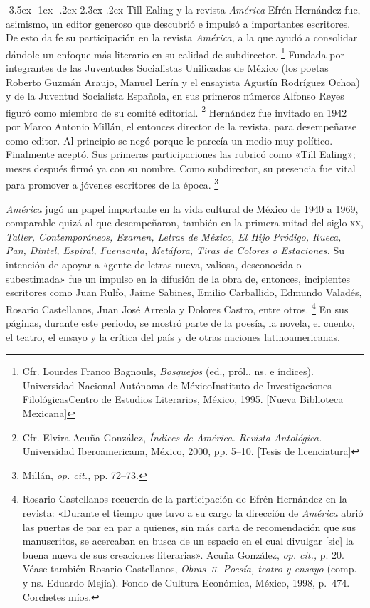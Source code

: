 \documentclass[14pt,twoside,final]{extbook} %
\makeatletter
\let\oldfootnote\footnote
\renewcommand\footnote[1]{%
\oldfootnote{\hspace{1mm}#1}}
\renewcommand\section{\@startsection {section}{1}{\z@}%
                                     {-3.5ex \@plus -1ex \@minus -.2ex}%
                                     {2.3ex \@plus .2ex}%
                                     {\normalfont\large\bfseries\sc}}
\makeatother
\begin{document}
\section{Till Ealing y la revista \emph{América}}\label{sec:till-ealing-y-la-revista-america}
Efrén Hernández fue, asimismo, un editor generoso que descubrió e impulsó a importantes escritores. De esto da fe su participación en la revista \emph{América,} a la que ayudó a consolidar dándole un enfoque más literario en su calidad de subdirector.\footnote{Cfr. Lourdes Franco Bagnouls, \emph{Bosquejos} (ed., pról., ns. e índices). Universidad Nacional Autónoma de México\kernedslash Instituto de Investigaciones Filológicas\kernedslash Centro de Estudios Literarios, México, 1995. [Nueva Biblioteca Mexicana]} Fundada por integrantes de las Juventudes Socialistas Unificadas de México (los poetas Roberto Guzmán Araujo, Manuel Lerín y el ensayista Agustín Rodríguez Ochoa) y de la Juventud Socialista Española, en sus primeros números Alfonso Reyes figuró como miembro de su comité editorial.\footnote{Cfr. Elvira Acuña González, \emph{Índices de \emph{América. Revista Antológica}.} Universidad Iberoamericana, México, 2000, pp. 5--10. [Tesis de licenciatura]} Hernández fue invitado en 1942 por Marco Antonio Millán, el entonces director de la revista, para desempeñarse como editor. Al principio se negó porque le parecía un medio muy político. Finalmente aceptó. Sus primeras participaciones las rubricó como «Till Ealing»; meses después firmó ya con su nombre. Como subdirector, su presencia fue vital para promover a jóvenes escritores de la época.\footnote{Millán, \emph{op. cit.,} pp. 72--73.}

\emph{América} jugó un papel importante en la vida cultural de México de 1940 a 1969, comparable quizá al que desempeñaron, también en la primera mitad del siglo \textsc{xx}, \textit{Taller, Contemporáneos, Examen, Letras de México, El Hijo Pródigo, Rueca, Pan, Dintel, Espiral, Fuensanta, Metáfora, Tiras de Colores \emph{o} Estaciones.} Su intención de apoyar a «gente de letras nueva, valiosa, desconocida o subestimada» fue un impulso en la difusión de la obra de, entonces, incipientes escritores como Juan Rulfo, Jaime Sabines, Emilio Carballido, Edmundo Valadés, Rosario Castellanos, Juan José Arreola y Dolores Castro, entre otros.\footnote{Rosario Castellanos recuerda de la participación de Efrén Hernández en la revista: «Durante el tiempo que tuvo a su cargo la dirección de \emph{América} abrió las puertas de par en par a quienes, sin más carta de recomendación que sus manuscritos, se acercaban en busca de un espacio en el cual divulgar [sic] la buena nueva de sus creaciones literarias». Acuña González, \emph{op. cit.,} p. 20. Véase también Rosario Castellanos, \emph{Obras~\textsc{ii}. Poesía, teatro y ensayo} (comp. y ns. Eduardo Mejía). Fondo de Cultura Económica, México, 1998, p.~474. Corchetes míos.} En sus páginas, durante este periodo, se mostró parte de la poesía, la novela, el cuento, el teatro, el ensayo y la crítica del país y de otras naciones latinoamericanas.
\end{document}
